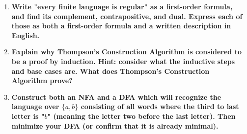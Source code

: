 \begin{enumerate}
\begin{enumerate}
\end{enumerate}

\newpage
\item \textbf{Write "every finite language is regular" as a first-order formula, and find its complement, contrapositive, and dual. Express each of those as both a first-order formula and a written description in English.}


\newpage
\item \textbf{Explain why Thompson's Construction Algorithm is considered to be a proof by induction. Hint: consider what the inductive steps and base cases are. What does Thompson's Construction Algorithm prove?}


\newpage
\item \textbf{Construct both an NFA and a DFA which will recognize the language over $\{a,b\}$ consisting of all words where the third to last letter is "$b$" (meaning the letter two before the last letter). Then minimize your DFA (or confirm that it is already minimal).}

\end{enumerate}


